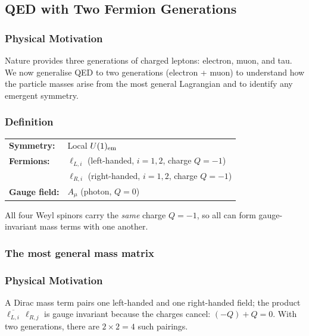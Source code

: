 \documentclass[../main.tex]{subfiles}
\begin{document}
\subsection*{QED with Two Fermion Generations}\label{sec:lec11:qed-two-gen}

\subsubsection*{Physical Motivation}

Nature provides three generations of charged leptons: electron, muon, and tau.  We now generalise QED to two generations (electron + muon) to understand how the particle masses arise from the most general Lagrangian and to identify any emergent symmetry.

\subsubsection*{Definition}

\begin{center}
\begin{tabular}{ll}
  \textbf{Symmetry:} & Local $U(1)_{\rm em}$ \\[3pt]
  \textbf{Fermions:} & $\ell_{L,i}$ (left-handed, $i=1,2$, charge $Q=-1$) \\
                     & $\ell_{R,i}$ (right-handed, $i=1,2$, charge $Q=-1$) \\[3pt]
  \textbf{Gauge field:} & $A_\mu$ (photon, $Q=0$)
\end{tabular}
\end{center}

\medskip
All four Weyl spinors carry the \emph{same} charge $Q=-1$, so all can form gauge-invariant mass terms with one another.

\subsubsection*{The most general mass matrix}

\subsubsection*{Physical Motivation}

A Dirac mass term pairs one left-handed and one right-handed field; the product $\overline{\ell_{L,i}}\,\ell_{R,j}$ is gauge invariant because the charges cancel: $(-Q)+Q=0$.  With two generations, there are $2\times2=4$ such pairings.
\end{document}
